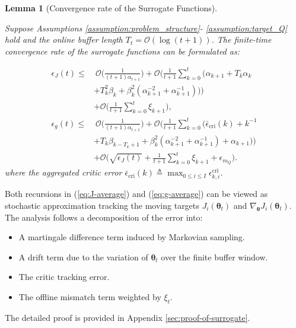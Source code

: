 \documentclass{IEEEtran}
\newtheorem{lemma}{Lemma}
\begin{document}
\begin{lemma}[Convergence rate of the Surrogate Functions]~

\label{lemma-convergence-rate-surrogate}

Suppose Assumptions \ref{assumption:problem_structure}- \ref{assumption:target_Q} hold and the online buffer length $T_{t}=\mathcal{O}(\log(t+1))$. The finite-time convergence rate of the surrogate functions can be formulated as:

\begin{align}
\epsilon_{J}(t)\le & \ \mathcal{O}\!\Big(\frac{1}{(t+1)\alpha_{t+1}}\Big)+\mathcal{O}\!\Big(\frac{1}{t+1}\sum_{k=0}^{t}\big(\alpha_{k+1}+T_{k}\alpha_{k}\nonumber \\
& +T_{k}^{2}\beta_{k}+\beta_{k}^{2}(\alpha_{k+1}^{-2}+\alpha_{k+1}^{-1})\big)\Big)\nonumber \\ & +\mathcal{O}\!\Big(\frac{1}{t+1}\sum_{k=0}^{t}\xi_{k+1}\Big),\label{eq:epsJ_rate}\\[1mm]
\epsilon_{g}(t)\le & \ \mathcal{O}\!\Big(\frac{1}{(t+1)\alpha_{t+1}}\Big)+\mathcal{O}\!\Big(\frac{1}{t+1}\sum_{k=0}^{t}\big(\bar{\epsilon}_{\mathrm{cri}}(k)+k^{-1}\nonumber \\
& +T_{k}\beta_{k-T_{k}+1}+\beta_{k}^{2}(\alpha_{k+1}^{-2}+\alpha_{k+1}^{-1})+\alpha_{k+1}\big)\Big)\nonumber \\ & +\mathcal{O}\!\Big(\sqrt{\epsilon_{J}(t)}+\frac{1}{t+1}\sum_{k=0}^{t}\xi_{k+1}+\epsilon_{m_{Q}}\Big).
\end{align}
where the aggregated critic error $\bar{\epsilon}_{\mathrm{cri}}(k)\triangleq\max_{0\le i\le I}\epsilon_{k,i}^{\mathrm{cri}}$.

\end{lemma}

\begin{IEEEproof}
Both recursions in (\ref{eq:J-average}) and (\ref{eq:g-average}) can be viewed as stochastic approximation tracking the moving targets $J_{i}(\boldsymbol{\theta}_{t})$ and $\nabla_{\boldsymbol{\theta}}J_{i}(\boldsymbol{\theta}_{t})$. The analysis follows a decomposition of the error into:
\begin{itemize}
\item A martingale difference term induced by Markovian sampling.
\item A drift term due to the variation of $\boldsymbol{\theta}_{t}$ over the finite buffer window.
\item The critic tracking error.
\item The offline mismatch term weighted by $\xi_{t}$.
\end{itemize}
The detailed proof is provided in Appendix \ref{sec:proof-of-surrogate}.
\end{IEEEproof}
\end{document}
